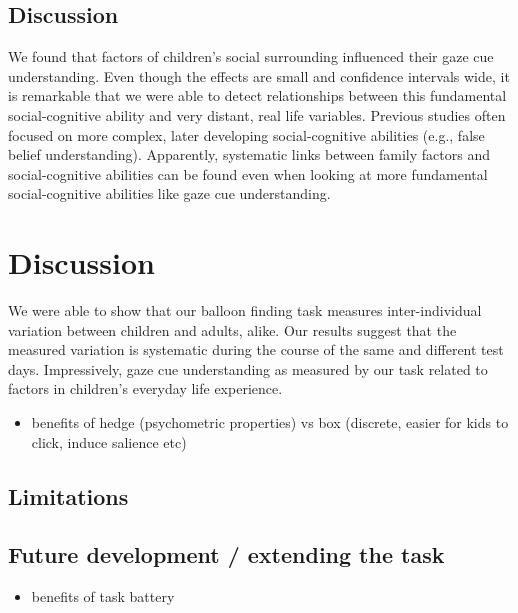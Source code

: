 \documentclass[
  man,floatsintext]{apa6}
\providecommand{\tightlist}{%
  \setlength{\itemsep}{0pt}\setlength{\parskip}{0pt}}
\begin{document}
\hypertarget{discussion-2}{%
\subsection{Discussion}\label{discussion-2}}

We found that factors of children's social surrounding influenced their gaze cue understanding. Even though the effects are small and confidence intervals wide, it is remarkable that we were able to detect relationships between this fundamental social-cognitive ability and very distant, real life variables. Previous studies often focused on more complex, later developing social-cognitive abilities (e.g., false belief understanding). Apparently, systematic links between family factors and social-cognitive abilities can be found even when looking at more fundamental social-cognitive abilities like gaze cue understanding.

\hypertarget{discussion-3}{%
\section{Discussion}\label{discussion-3}}

We were able to show that our balloon finding task measures inter-individual variation between children and adults, alike. Our results suggest that the measured variation is systematic during the course of the same and different test days. Impressively, gaze cue understanding as measured by our task related to factors in children's everyday life experience.

\begin{itemize}
\tightlist
\item
  benefits of hedge (psychometric properties) vs box (discrete, easier for kids to click, induce salience etc)
\end{itemize}

\hypertarget{limitations}{%
\subsection{Limitations}\label{limitations}}

\hypertarget{future-development-extending-the-task}{%
\subsection{Future development / extending the task}\label{future-development-extending-the-task}}

\begin{itemize}
\tightlist
\item
  benefits of task battery
\end{itemize}
\end{document}
